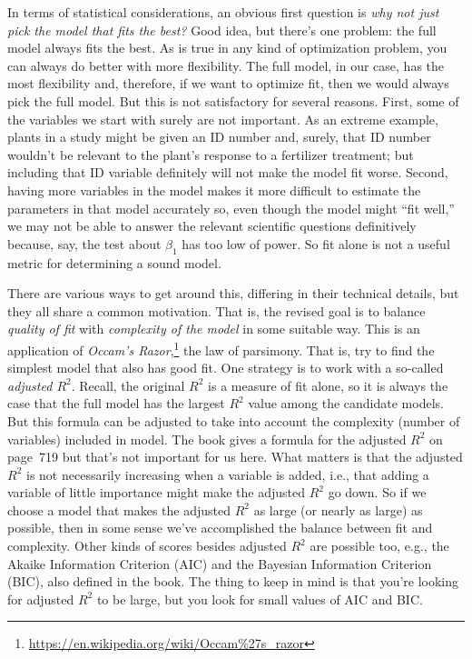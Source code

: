 \documentclass[a4paper, 12pt]{article}
\theoremstyle{plain}
\theoremstyle{definition}
\theoremstyle{remark}
\begin{document}
In terms of statistical considerations, an obvious first question is {\em why not just pick the model that fits the best?}  Good idea, but there's one problem: the full model always fits the best.  As is true in any kind of optimization problem, you can always do better with more flexibility.  The full model, in our case, has the most flexibility and, therefore, if we want to optimize fit, then we would always pick the full model.  But this is not satisfactory for several reasons.  First, some of the variables we start with surely are not important. As an extreme example, plants in a study might be given an ID number and, surely, that ID number wouldn't be relevant to the plant's response to a fertilizer treatment; but including that ID variable definitely will not make the model fit worse.  Second, having more variables in the model makes it more difficult to estimate the parameters in that model accurately so, even though the model might ``fit well,'' we may not be able to answer the relevant scientific questions definitively because, say, the test about $\beta_1$ has too low of power.  So fit alone is not a useful metric for determining a sound model.  

There are various ways to get around this, differing in their technical details, but they all share a common motivation.  That is, the revised goal is to balance {\em quality of fit} with {\em complexity of the model} in some suitable way.  This is an application of {\em Occam's Razor},\footnote{\url{https://en.wikipedia.org/wiki/Occam\%27s_razor}} the law of parsimony.  That is, try to find the simplest model that also has good fit.  One strategy is to work with a so-called {\em adjusted $R^2$}.  Recall, the original $R^2$ is a measure of fit alone, so it is always the case that the full model has the largest $R^2$ value among the candidate models.  But this formula can be adjusted to take into account the complexity (number of variables) included in model.  The book gives a formula for the adjusted $R^2$ on page~719 but that's not important for us here.  What matters is that the adjusted $R^2$ is not necessarily increasing when a variable is added, i.e., that adding a variable of little importance might make the adjusted $R^2$ go down.  So if we choose a model that makes the adjusted $R^2$ as large (or nearly as large) as possible, then in some sense we've accomplished the balance between fit and complexity.  Other kinds of scores besides adjusted $R^2$ are possible too, e.g., the Akaike Information Criterion (AIC) and the Bayesian Information Criterion (BIC), also defined in the book.  The thing to keep in mind is that you're looking for adjusted $R^2$ to be large, but you look for small values of AIC and BIC.  
\end{document}
